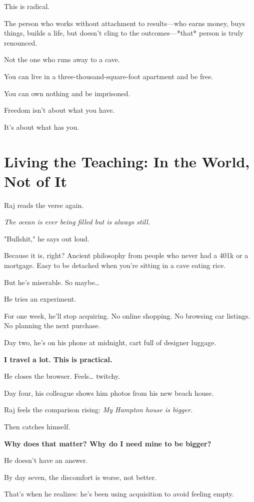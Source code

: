 \documentclass[11pt,twoside]{book}
\begin{document}
This is radical.

The person who works without attachment to results—who earns money, buys things, builds a life, but doesn't cling to the outcomes—*that* person is truly renounced.

Not the one who runs away to a cave.

You can live in a three-thousand-square-foot apartment and be free.

You can own nothing and be imprisoned.

Freedom isn't about what you have.

It's about what has you.

\section*{Living the Teaching: In the World, Not of It}

Raj reads the verse again.

\emph{The ocean is ever being filled but is always still.}

"Bullshit," he says out loud.

Because it is, right? Ancient philosophy from people who never had a 401k or a mortgage. Easy to be detached when you're sitting in a cave eating rice.

But he's miserable. So maybe\ldots{}

He tries an experiment.

For one week, he'll stop acquiring. No online shopping. No browsing car listings. No planning the next purchase.

Day two, he's on his phone at midnight, cart full of designer luggage.

\textbf{I travel a lot. This is practical.}

He closes the browser. Feels\ldots{} twitchy.

Day four, his colleague shows him photos from his new beach house.

Raj feels the comparison rising: \emph{My Hampton house is bigger.}

Then catches himself.

\textbf{Why does that matter? Why do I need mine to be bigger?}

He doesn't have an answer.

By day seven, the discomfort is worse, not better.

That's when he realizes: he's been using acquisition to avoid feeling empty.
\end{document}
